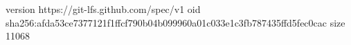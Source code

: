 version https://git-lfs.github.com/spec/v1
oid sha256:afda53ce7377121f1ffcf790b04b099960a01c033e1c3fb787435ffd5fec0cac
size 11068
